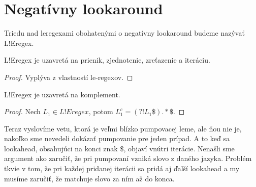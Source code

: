 \section{Negatívny lookaround}\label{chap:negla}

\begin{df}
Triedu nad leregexami obohatenými o negatívny lookaround budeme nazývať L!Eregex.
\end{df}

\begin{veta}
L!Eregex je uzavretá na prienik, zjednotenie, zreťazenie a iteráciu.
\end{veta}
\begin{proof}
Vyplýva z vlastností le-regexov.
\end{proof}

\begin{veta}
L!Eregex je uzavretá na komplement.
\end{veta}
\begin{proof}
Nech $L_1 \in L!Eregex$, potom $L_1^c  = \left( ?! L_1 \mathdollar \right) .* \mathdollar $.
\end{proof}

Teraz vyslovíme vetu, ktorá je veľmi blízko pumpovacej leme, ale ňou nie je, nakoľko sme nevedeli dokázať pumpovanie pre jeden prípad. A to keď sa lookahead, obsahujúci na konci znak $\mathdollar$, objaví vnútri iterácie. Nenašli sme argument ako zaručiť, že pri pumpovaní vzniká slovo z daného jazyka. Problém tkvie v tom, že pri každej pridanej iterácii sa pridá aj ďalší lookahead a my musíme zaručiť, že matchuje slovo za ním až do konca.

